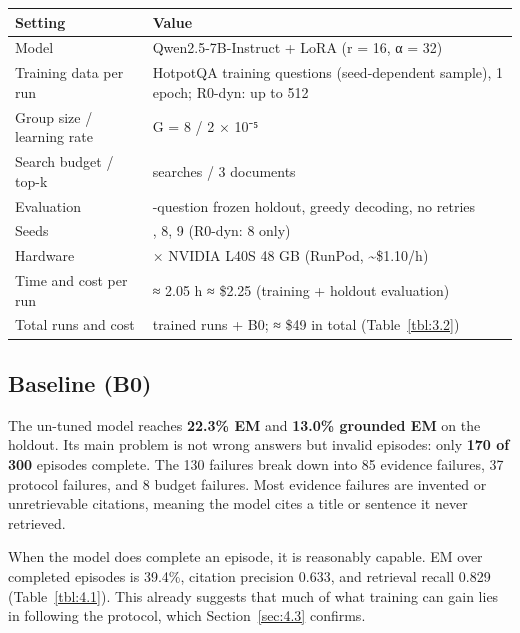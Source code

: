{\def\LTcaptype{none} %
\begin{longtable}[]{@{}
  >{\raggedright\arraybackslash}p{}
  >{\raggedright\arraybackslash}p{}@{}}
\toprule\noalign{}
\begin{minipage}[b]{\linewidth}\raggedright
Setting
\end{minipage} & \begin{minipage}[b]{\linewidth}\raggedright
Value
\end{minipage} \\
\midrule\noalign{}
\endhead
\bottomrule\noalign{}
\endlastfoot
Model & Qwen2.5-7B-Instruct + LoRA (r = 16, α = 32) \\
Training data per run & 256 HotpotQA training questions (seed-dependent
sample), 1 epoch; R0-dyn: up to 512 \\
Group size / learning rate & G = 8 / 2 × 10⁻⁵ \\
Search budget / top-k & 3 searches / 3 documents \\
Evaluation & 300-question frozen holdout, greedy decoding, no retries \\
Seeds & 7, 8, 9 (R0-dyn: 8 only) \\
Hardware & 1 × NVIDIA L40S 48 GB (RunPod, \textasciitilde\$1.10/h) \\
Time and cost per run & ≈ 2.05 h ≈ \$2.25 (training + holdout
evaluation) \\
Total runs and cost & 16 trained runs + B0; ≈ \$49 in total
(Table~\ref{tbl:3.2}) \\
\end{longtable}
}

\subsection{Baseline (B0)}\label{sec:4.2}

The un-tuned model reaches \textbf{22.3\% EM} and \textbf{13.0\%
grounded EM} on the holdout. Its main problem is not wrong answers but
invalid episodes: only \textbf{170 of 300} episodes complete. The 130
failures break down into 85 evidence failures, 37 protocol failures, and
8 budget failures. Most evidence failures are invented or unretrievable
citations, meaning the model cites a title or sentence it never
retrieved.

When the model does complete an episode, it is reasonably capable. EM
over completed episodes is 39.4\%, citation precision 0.633, and
retrieval recall 0.829 (Table~\ref{tbl:4.1}). This already suggests that
much of what training can gain lies in following the protocol, which
Section~\ref{sec:4.3} confirms.

